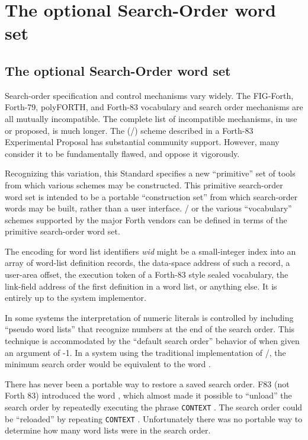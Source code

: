 \chapter{The optional Search-Order word set} %

\begin{info}
\section{The optional Search-Order word set} %

Search-order specification and control mechanisms vary widely. The
FIG-Forth, Forth-79, polyFORTH, and Forth-83 vocabulary and search
order mechanisms are all mutually incompatible. The complete list of
incompatible mechanisms, in use or proposed, is much longer. The
(/) scheme described in a Forth-83 Experimental
Proposal has substantial community support. However, many consider it
to be fundamentally flawed, and oppose it vigorously.

Recognizing this variation, this Standard specifies a new ``primitive''
set of tools from which various schemes may be constructed. This
primitive search-order word set is intended to be a portable
``construction set'' from which search-order words may be built,
rather than a user interface. / or the various
``vocabulary'' schemes supported by the major Forth vendors can be
defined in terms of the primitive search-order word set.

The encoding for word list identifiers \emph{wid} might be a
small-integer index into an array of word-list definition records, the
data-space address of such a record, a user-area offset, the execution
token of a Forth-83 style sealed vocabulary, the link-field address of
the first definition in a word list, or anything else. It is entirely
up to the system implementor.

In some systems the interpretation of numeric literals is controlled
by including ``pseudo word lists'' that recognize numbers at the end
of the search order. This technique is accommodated by the ``default
search order'' behavior of  when given an argument of
-1. In a system using the traditional implementation of
/, the minimum search order would be equivalent
to the word .

There has never been a portable way to restore a saved search order.
F83 (not Forth 83) introduced the word , which almost
made it possible to ``unload'' the search order by repeatedly executing
the phrase \texttt{CONTEXT}  . The search
order could be ``reloaded'' by repeating  \texttt{CONTEXT}
\word[core]{!}. Unfortunately there was no portable way to determine
how many word lists were in the search order.


\end{info}
